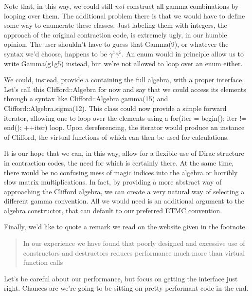 \documentclass[a4paper,10pt]{article}
\begin{document}
Note that, in this way, we could still \emph{not} construct all gamma combinations by looping over them. 
The additional problem there is that we would have to define some way to enumerate these classes. Just 
labeling them with integers, the approach of the original contraction code, is extremely ugly, in our humble 
opinion. The user shouldn't have to guess that Gamma(9), or whatever the syntax we'd choose, happens to be
$\gamma^1\gamma^5$. An enum would in principle allow us to write Gamma(g1g5) instead, but we're not allowed to 
loop over an enum either.

We could, instead, provide a containing the full algebra, with a proper interface. Let's call this Clifford::Algebra
for now and say that we could access its elements through a syntax like Clifford::Algebra.gamma(15) and 
Clifford::Algebra.sigma(12). This class could now provide a simple forward iterator, allowing one to loop over
the elements using a for(iter = begin(); iter != end(); ++iter) loop. Upon dereferencing, the iterator would
produce an instance of Clifford, the virtual functions of which can then be used for calculations.

It is our hope that we can, in this way, allow for a flexible use of Dirac structure in contraction codes,
the need for which is certainly there. At the same time, there would be no confusing mess of magic indices into
the algebra or horribly slow matrix multiplications. In fact, by providing a more abstract way of approaching
the Clifford algebra, we can create a very natural way of selecting a different gamma convention. All we would
need is an additional argument to the algebra constructor, that can default to our preferred ETMC convention.

Finally, we'd like to quote a remark we read on the website given in the footnote.
\begin{quote}
 In our experience we have found that poorly designed and excessive use of constructors and destructors 
 reduces performance much more than virtual function calls
\end{quote}
Let's be careful about our performance, but focus on getting the interface just right. Chances are we're
going to be sitting on pretty performant code in the end.
\end{document}

